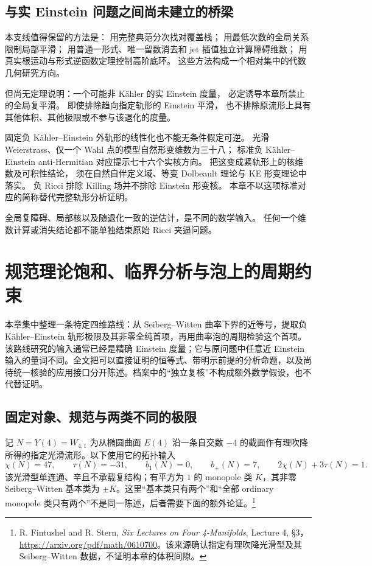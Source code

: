 \documentclass[UTF8,fontset=fandol,zihao=-4,oneside,openany]{ctexbook}
\theoremstyle{cjkplain}
\numberwithin{equation}{chapter}
\begin{document}
\section{与实 Einstein 问题之间尚未建立的桥梁}

本支线值得保留的方法是：
用完整典范分次找对覆盖栈；
用最低次数的全局关系限制局部平滑；
用普通一形式、唯一留数消去和 jet 插值独立计算障碍维数；
用真实根运动与形式逆函数定理控制高阶底环。
这些方法构成一个相对集中的代数几何研究方向。

但尚无定理说明：一个可能非 Kähler 的实 Einstein 度量，
必定诱导本章所禁止的全局复平滑。
即使排除趋向指定轨形的 Einstein 平滑，
也不排除原流形上具有其他体积、其他极限或不参与该退化的度量。

固定负 Kähler--Einstein 外轨形的线性化也不能无条件假定可逆。
光滑 Weierstrass、仅一个 Wahl 点的模型自然形变维数为三十八；
标准负 Kähler--Einstein anti-Hermitian 对应提示七十六个实核方向。
把这变成紧轨形上的核维数及可积性结论，
须在自然自伴定义域、等变 Dolbeault 理论与 KE 形变理论中落实。
负 Ricci 排除 Killing 场并不排除 Einstein 形变核。
本章不以这项标准对应的简称替代完整轨形分析证明。

全局复障碍、局部核以及随退化一致的逆估计，是不同的数学输入。
任何一个维数计算或消失结论都不能单独结束原始 Ricci 夹逼问题。


\chapter{规范理论饱和、临界分析与泡上的周期约束}
\label{GAU:chapter}

本章集中整理一条特定四维路线：从 Seiberg--Witten 曲率下界的近等号，提取负 Kähler--Einstein 轨形极限及其非零全纯首项，再用曲率泡的周期检验这个首项。该路线研究的输入通常已经是精确 Einstein 度量；它与原问题中任意近 Einstein 输入的量词不同。全文把可以直接证明的恒等式、带明示前提的分析命题，以及尚待统一核验的应用接口分开陈述。档案中的“独立复核”不构成额外数学假设，也不代替证明。

\section{固定对象、规范与两类不同的极限}
\label{GAU:setup}

记 $N=Y(4)=W_{4,1}$ 为从椭圆曲面 $E(4)$ 沿一条自交数 $-4$ 的截面作有理吹降所得的指定光滑流形。以下使用它的拓扑输入
\begin{equation}\label{GAU:topology}
\chi(N)=47,\qquad \tau(N)=-31,\qquad b_1(N)=0,\qquad
b_+(N)=7,\qquad 2\chi(N)+3\tau(N)=1.
\end{equation}
该光滑型单连通、辛且不承载复结构；有平方为 $1$ 的 monopole 类 $K$，其非零 Seiberg--Witten 基本类为 $\pm K$。这里“基本类只有两个”和“全部 ordinary monopole 类只有两个”不是同一陈述，后者需要下面的额外论证。\footnote{R. Fintushel and R. Stern, \emph{Six Lectures on Four 4-Manifolds}, Lecture 4, §3，\url{https://arxiv.org/pdf/math/0610700}。该来源确认指定有理吹降光滑型及其 Seiberg--Witten 数据，不证明本章的体积间隙。}
\end{document}
